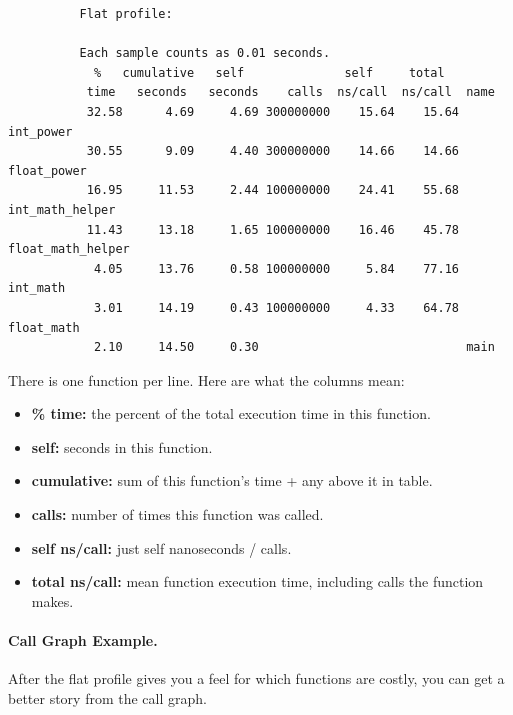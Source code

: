   \begin{lstlisting}
          Flat profile:

          Each sample counts as 0.01 seconds.
            %   cumulative   self              self     total           
           time   seconds   seconds    calls  ns/call  ns/call  name    
           32.58      4.69     4.69 300000000    15.64    15.64  int_power
           30.55      9.09     4.40 300000000    14.66    14.66  float_power
           16.95     11.53     2.44 100000000    24.41    55.68  int_math_helper
           11.43     13.18     1.65 100000000    16.46    45.78  float_math_helper
            4.05     13.76     0.58 100000000     5.84    77.16  int_math
            3.01     14.19     0.43 100000000     4.33    64.78  float_math
            2.10     14.50     0.30                             main
  \end{lstlisting}

 There is one function per line. Here are what the columns mean:
  \begin{itemize}
    \item {\bf \% time:} the percent of the total execution time in this function.
    \item {\bf self:} seconds in this function.
    \item {\bf cumulative:} sum of this function's time + any above it in table.
    \item {\bf calls:} number of times this function was called.
    \item {\bf self ns/call:} just self nanoseconds / calls.
    \item {\bf total ns/call:} mean function execution time, including
       calls the function makes.
  \end{itemize}

\paragraph{Call Graph Example.}
After the flat profile gives you a feel for which functions are costly, you
      can get a better story from the call graph.

